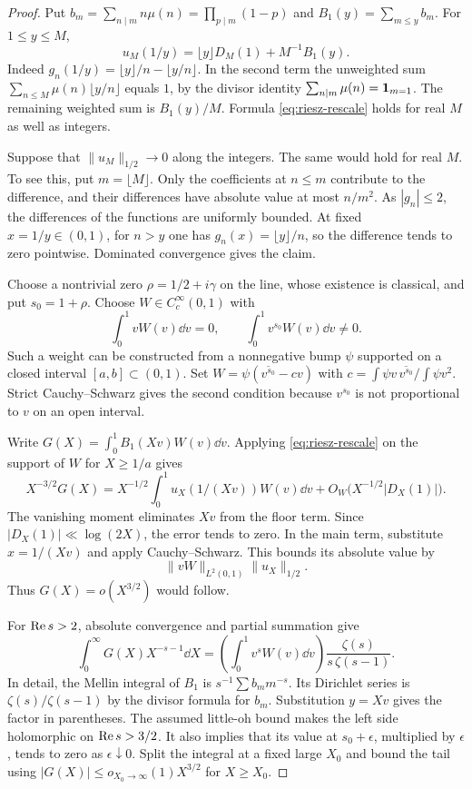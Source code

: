 \begin{proof}
Put \(b_m=\sum_{n\mid m}n\mu(n)=\prod_{p\mid m}(1-p)\) and \(B_1(y)=\sum_{m\le y}b_m\). For \(1\le y\le M\),
\begin{equation}\label{eq:riesz-rescale}
 u_M(1/y)=\lfloor y\rfloor D_M(1)+M^{-1}B_1(y).
\end{equation}
Indeed \(g_n(1/y)=\lfloor y\rfloor/n-\lfloor y/n\rfloor\). In the second term the unweighted sum \(\sum_{n\le M}\mu(n)\lfloor y/n\rfloor\) equals \(1\), by the divisor identity \(\sum_{n\mid m}\mu(n)=\mathbf 1_{m=1}\). The remaining weighted sum is \(B_1(y)/M\). Formula \eqref{eq:riesz-rescale} holds for real \(M\) as well as integers.

Suppose that \(\|u_M\|_{1/2}\to0\) along the integers. The same would hold for real \(M\). To see this, put \(m=\lfloor M\rfloor\). Only the coefficients at \(n\le m\) contribute to the difference, and their differences have absolute value at most \(n/m^2\). As \(|g_n|\le2\), the differences of the functions are uniformly bounded. At fixed \(x=1/y\in(0,1)\), for \(n>y\) one has \(g_n(x)=\lfloor y\rfloor/n\), so the difference tends to zero pointwise. Dominated convergence gives the claim.

Choose a nontrivial zero \(\rho=1/2+i\gamma\) on the line, whose existence is classical, and put \(s_0=1+\rho\). Choose \(W\in C_c^\infty(0,1)\) with
\[
 \int_0^1 vW(v)\dd v=0,\qquad
 \int_0^1 v^{s_0}W(v)\dd v\ne0.
\]
Such a weight can be constructed from a nonnegative bump \(\psi\) supported on a closed interval \([a,b]\subset(0,1)\). Set \(W=\psi(\overline{v^{s_0}}-c v)\) with \(c=\int\psi v\,\overline{v^{s_0}}/\int\psi v^2\). Strict Cauchy--Schwarz gives the second condition because \(v^{s_0}\) is not proportional to \(v\) on an open interval.

Write \(G(X)=\int_0^1 B_1(Xv)W(v)\dd v\). Applying \eqref{eq:riesz-rescale} on the support of \(W\) for \(X\ge1/a\) gives
\[
 X^{-3/2}G(X)=X^{-1/2}\int_0^1 u_X(1/(Xv))W(v)\dd v
 +O_W\bigl(X^{-1/2}|D_X(1)|\bigr).
\]
The vanishing moment eliminates \(Xv\) from the floor term. Since \(|D_X(1)|\ll\log(2X)\), the error tends to zero. In the main term, substitute \(x=1/(Xv)\) and apply Cauchy--Schwarz. This bounds its absolute value by
\[
 \|vW\|_{L^2(0,1)}\|u_X\|_{1/2}.
\]
Thus \(G(X)=o(X^{3/2})\) would follow.

For \(\operatorname{Re} s>2\), absolute convergence and partial summation give
\[
 \int_0^\infty G(X)X^{-s-1}\dd X
 =\left(\int_0^1 v^s W(v)\dd v\right)
   \frac{\zeta(s)}{s\,\zeta(s-1)} .
\]
In detail, the Mellin integral of \(B_1\) is \(s^{-1}\sum b_m m^{-s}\). Its Dirichlet series is \(\zeta(s)/\zeta(s-1)\) by the divisor formula for \(b_m\). Substitution \(y=Xv\) gives the factor in parentheses. The assumed little-oh bound makes the left side holomorphic on \(\operatorname{Re} s>3/2\). It also implies that its value at \(s_0+\epsilon\), multiplied by \(\epsilon\), tends to zero as \(\epsilon\downarrow0\). Split the integral at a fixed large \(X_0\) and bound the tail using \(|G(X)|\le o_{X_0\to\infty}(1)X^{3/2}\) for \(X\ge X_0\).


\end{proof}
